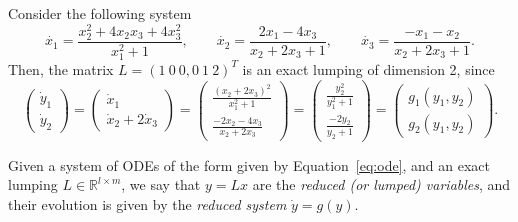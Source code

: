 \begin{myExample} \label{ex:firstode}
	Consider the following system
	\begin{equation} \label{eq:example1}
		\dot{x_{1}} = \frac {x_{2}^{2} +4x_{2}x_{3} +4x_{3}^{2}}{x_{1}^{2} + 1 },\qquad
		\dot{x_{2}} = \frac{2x_{1}-4x_{3}}{x_{2}+2x_{3} + 1},\qquad
		\dot{x_{3}} = \frac{-x_{1}-x_{2}}{x_{2}+2x_{3}+1}.
	\end{equation}
	Then, the matrix $L = (1 \ 0\ 0, 0\ 1\  2)^{T}$
	is an exact lumping of dimension 2, since
	\begin{equation*}
		\begin{pmatrix}
			\dot{y}_{1} \\
			\dot{y}_{2}
		\end{pmatrix}
		=
		\begin{pmatrix}
			\dot{x}_{1} \\
			\dot{x}_{2} +2 \dot{x}_{3}
		\end{pmatrix}
		=
		\begin{pmatrix}
			\frac{(x_{2}+2x_{3})^{2}}{x_{1}^{2}+1} \\
			\frac{-2x_{2}-4x_{3}}{x_{2}+2x_{3}}
		\end{pmatrix}
		=
		\begin{pmatrix}
			\frac{y_{2}^{2}}{y_{1}^{2}+1} \\
			\frac{-2y_{2}}{y_{2}+1}
		\end{pmatrix}
		=
		\begin{pmatrix}
			g_{1}(y_{1},y_{2}) \\
			g_{2}(y_{1},y_{2})
		\end{pmatrix}.
	\end{equation*}
\end{myExample}

\begin{definition}\label{def:constlump}
	Given a system of ODEs of the form given by Equation~\eqref{eq:ode}, and an exact lumping $L\in \mathbb{R}^{l\times m}$, we say that $y= Lx$ are the \emph{reduced (or lumped) variables}, 	and their evolution is given by the \emph{reduced system} $ \dot{y}= g(y)$.
\end{definition}

